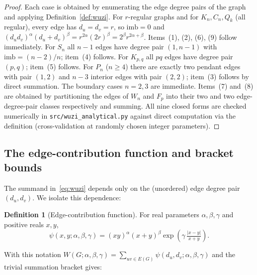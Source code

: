 \documentclass[11pt,a4paper]{article}
\theoremstyle{definition}
\newtheorem{definition}[theorem]{Definition}
\newcommand{\Wuzi}{W(G;\alpha,\beta,\gamma)}
\newcommand{\edgepsi}{\psi(x,y;\alpha,\beta,\gamma)}
\begin{document}
\begin{proof}
Each case is obtained by enumerating the edge degree pairs of the
graph and applying Definition~\ref{def:wuzi}.
For $r$-regular graphs and for $K_n, C_n, Q_k$ (all regular), every
edge has $d_u=d_v=r$, so $\mathrm{imb}=0$ and
$(d_u d_v)^{\alpha}(d_u+d_v)^{\beta}=r^{2\alpha}(2r)^{\beta}=2^{\beta}r^{2\alpha+\beta}$.
Items~(1), (2), (6), (9) follow immediately.
For $S_n$ all $n-1$ edges have degree pair $(1,n-1)$ with
$\mathrm{imb}=(n-2)/n$; item~(4) follows.
For $K_{p,q}$ all $pq$ edges have degree pair $(p,q)$; item~(5) follows.
For $P_n$ ($n\ge 4$) there are exactly two pendant edges with pair
$(1,2)$ and $n-3$ interior edges with pair $(2,2)$; item~(3)
follows by direct summation. The boundary cases $n=2,3$ are immediate.
Items~(7) and~(8) are obtained by partitioning the edges of $W_n$
and $F_p$ into their two and two edge-degree-pair classes
respectively and summing.
All nine closed forms are checked numerically in
\texttt{src/wuzi\_analytical.py} against direct computation via the
definition (cross-validation at randomly chosen integer parameters).
\end{proof}

\subsection{The edge-contribution function and bracket bounds}\label{sec:psi}

The summand in~\eqref{eq:wuzi} depends only on the (unordered)
edge degree pair $(d_u,d_v)$. We isolate this dependence:

\begin{definition}[Edge-contribution function]
For real parameters $\alpha,\beta,\gamma$ and positive reals $x,y$,
\begin{equation}\label{eq:psi}
\edgepsi=(xy)^{\alpha}(x+y)^{\beta}\exp\!\left(\gamma\,\tfrac{|x-y|}{x+y}\right).
\end{equation}
\end{definition}

With this notation $\Wuzi=\sum_{uv\in E(G)}\psi(d_u,d_v;\alpha,\beta,\gamma)$
and the trivial summation bracket gives:
\end{document}
